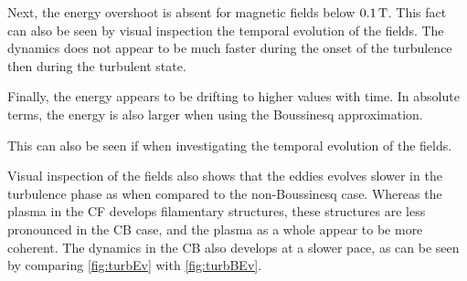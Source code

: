 Next, the energy overshoot is absent for magnetic fields below $0.1\, \text{T}$.
This fact can also be seen by visual inspection the temporal evolution of the fields.
The dynamics does not appear to be much faster during the onset of the turbulence then during the turbulent state.

Finally, the energy appears to be drifting to higher values with time.
In absolute terms, the energy is also larger when using the Boussinesq approximation.

This can also be seen if when investigating the temporal evolution of the fields.

Visual inspection of the fields also shows that the eddies evolves slower in the turbulence phase as when compared to the non-Boussinesq case.
Whereas the plasma in the CF develops filamentary structures, these structures are less pronounced in the CB case, and the plasma as a whole appear to be more coherent.
The dynamics in the CB also develops at a slower pace, as can be seen by comparing \cref{fig:turbEv} with \cref{fig:turbBEv}.
%
